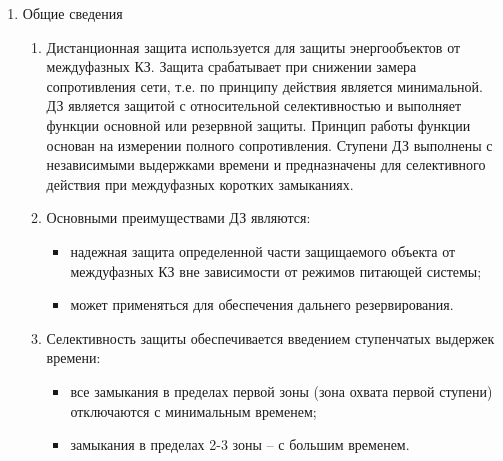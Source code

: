 
\color{black}

\begin{enumerate}
\item Общие сведения

\begin{enumerate}

\item
Дистанционная защита используется для защиты энергообъектов от междуфазных КЗ. Защита срабатывает при снижении замера  сопротивления  сети,  т.е.  по  принципу  действия  является  минимальной.  ДЗ  является  защитой с относительной  селективностью  и  выполняет  функции  основной  или  резервной  защиты. Принцип работы функции основан на измерении полного сопротивления. Ступени ДЗ выполнены с независимыми выдержками времени и предназначены для селективного действия при междуфазных коротких замыканиях.

\item 
Основными преимуществами ДЗ являются:
\begin{itemize}
    \item надежная защита определенной части защищаемого объекта от междуфазных КЗ вне зависимости от режимов питающей системы; 
    \item может  применяться  для  обеспечения  дальнего  резервирования.
\end{itemize}

\item 
Селективность защиты обеспечивается введением ступенчатых выдержек времени:
\begin{itemize} 
\item все замыкания в пределах первой зоны (зона охвата первой ступени) отключаются с минимальным временем; 
\item замыкания в пределах 2-3 зоны -- с большим временем.
\end{itemize}


\end{enumerate}
\end{enumerate}
